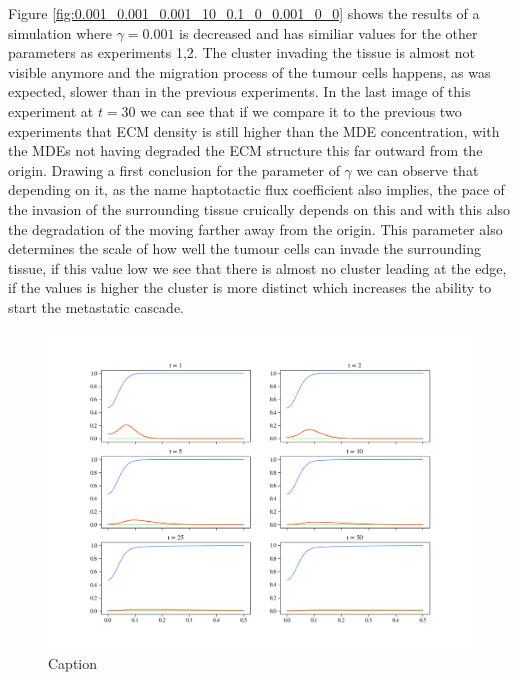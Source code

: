 Figure \ref{fig:0.001_0.001_0.001_10_0.1_0_0.001_0_0} shows the results of a simulation where $\gamma = 0.001$ is decreased and has similiar values for the other parameters as experiments 1,2. The cluster invading the tissue is almost not visible anymore and the migration process of the tumour cells happens, as was expected, slower than in the previous experiments. In the last image of this experiment at $t = 30$ we can see that if we compare it to the previous two experiments that ECM density is still higher than the MDE concentration, with the MDEs not having degraded the ECM structure this far outward from the origin. \newline
Drawing a first conclusion for the parameter of $\gamma$ we can observe that depending on it, as the name haptotactic flux coefficient also implies, the pace of the invasion of the surrounding tissue cruically depends on this and with this also the degradation of the moving farther away from the origin. This parameter also determines the scale of how well the tumour cells can invade the surrounding tissue, if this value low we see that there is almost no cluster leading at the edge, if the values is higher the cluster is more distinct which increases the ability to start the metastatic cascade.\newline
\begin{figure}
    \centering
    \includegraphics[width=\textwidth]{resources/images/0.001_0.001_0.001_10_0.1_0.5_0.005_0_0.png}
    \caption{Caption}
    \label{fig:0.001_0.001_0.001_10_0.1_0.5_0.005_0_0}
\end{figure}
